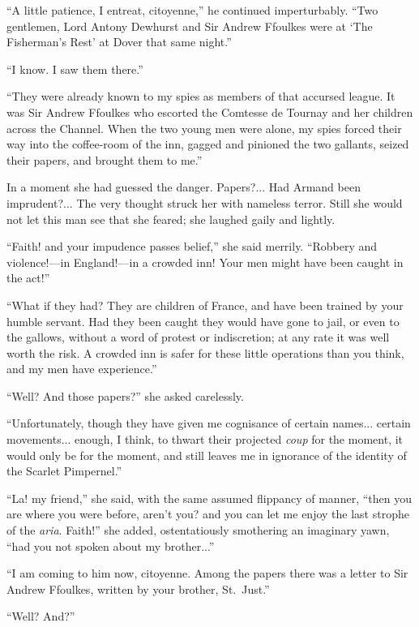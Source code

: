 \documentclass[paper=5.5in:8.5in,BCOR=7mm,twoside,DIV=calc,12pt,usegeometry,chapterprefix,endperiod,headings=big]{scrbook}
\begin{document}
\enquote{A little patience, I entreat, citoyenne,} he continued imperturbably. \enquote{Two gentlemen, Lord Antony Dewhurst and Sir Andrew Ffoulkes were at \enquote{The Fisherman's Rest} at Dover that same night.}

\enquote{I know. I saw them there.}

\enquote{They were already known to my spies as members of that accursed league. It was Sir Andrew Ffoulkes who escorted the Comtesse de Tournay and her children across the Channel. When the two young men were alone, my spies forced their way into the coffee-room of the inn, gagged and pinioned the two gallants, seized their papers, and brought them to me.}

In a moment she had guessed the danger. Papers?... Had Armand been imprudent?... The very thought struck her with nameless terror. Still she would not let this man see that she feared; she laughed gaily and lightly.

\enquote{Faith! and your impudence passes belief,} she said merrily. \enquote{Robbery and violence!---in England!---in a crowd\-ed inn! Your men might have been caught in the act!}

\enquote{What if they had? They are children of France, and have been trained by your humble servant. Had they been caught they would have gone to jail, or even to the gallows, without a word of protest or indiscretion; at any rate it was well worth the risk. A crowded inn is safer for these little operations than you think, and my men have experience.}

\enquote{Well? And those papers?} she asked carelessly.

\enquote{Unfortunately, though they have given me cognisance of certain names... certain movements... enough, I think, to thwart their projected \textit{coup} for the moment, it would only be for the moment, and still leaves me in ignorance of the identity of the Scarlet Pimpernel.}

\enquote{La! my friend,} she said, with the same assumed flippancy of manner, \enquote{then you are where you were before, aren't you? and you can let me enjoy the last strophe of the \textit{aria}. Faith!} she added, ostentatiously smothering an imaginary yawn, \enquote{had you not spoken about my brother...}

\enquote{I am coming to him now, citoyenne. Among the papers there was a letter to Sir Andrew Ffoulkes, written by your brother, St.~Just.}

\enquote{Well? And?}
\end{document}
